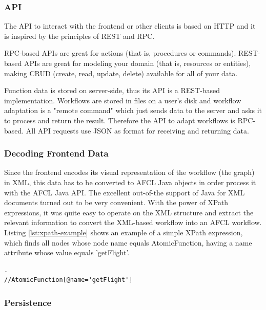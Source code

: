 \documentclass[a4paper,top=25mm,bottom=25mm,12pt,pdftex,halfparskip,twoside,bibtotoc,numbers=noenddot]{scrbook}
\begin{document}
\subsubsection{API}
 
The API to interact with the frontend or other clients is based on HTTP and it is inspired by the principles of REST and RPC.

RPC-based APIs are great for actions (that is, procedures or commands).
REST-based APIs are great for modeling your domain (that is, resources or entities), making CRUD (create, read, update, delete) available for all of your data. \cite{online-smashingmagazine-rest-vs-rpc}

Function data is stored on server-side, thus its API is a REST-based implementation. Workflows are stored in files on a user's disk and workflow adaptation is a "remote command" which just sends data to the server and asks it to process and return the result. Therefore the API to adapt workflows is RPC-based. All API requests use JSON as format for receiving and returning data.

\subsubsection{Decoding Frontend Data}
\label{sec:backend-decoding}

Since the frontend encodes its visual representation of the workflow (the graph) in XML, this data has to be converted to AFCL Java objects in order process it with the AFCL Java API.
The excellent out-of-the support of Java for XML documents turned out to be very convenient. With the power of XPath expressions, it was quite easy to operate on the XML structure and extract the relevant information to convert the XML-based workflow into an AFCL workflow. Listing \ref{lst:xpath-example} shows an example of a simple XPath expression, which finds all nodes whose node name equals \textsf{AtomicFunction}, having a \textsf{name} attribute whose value equals 'getFlight'.

\vspace{0.25cm}
\begin{lstlisting}[caption={Example of an XPath expression.},label={lst:xpath-example}].
//AtomicFunction[@name='getFlight']
\end{lstlisting}

\subsubsection{Persistence}
\label{sec:backend-persistence}
\end{document}
